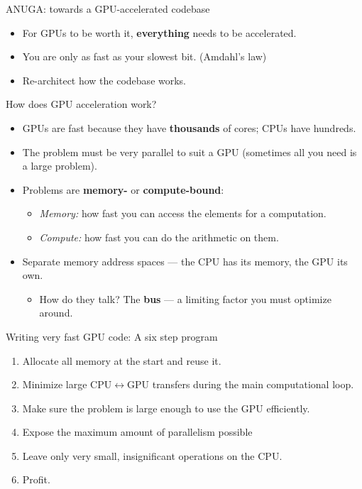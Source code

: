 \documentclass[aspectratio=169]{beamer}
\newcommand{\cplx}[1]{{\footnotesize\color{cookieMuted}#1}}
\begin{document}
\begin{frame}{ANUGA: towards a GPU-accelerated codebase}
  \begin{itemize}\setlength\itemsep{6pt}
    \item For GPUs to be worth it, \textbf{everything} needs to be accelerated.
    \item You are only as fast as your slowest bit. (Amdahl's law)
    \item Re-architect how the codebase works.
  \end{itemize}
\end{frame}

\begin{frame}{How does GPU acceleration work?}
  \begin{itemize}
    \item GPUs are fast because they have \textbf{thousands} of cores; CPUs have hundreds.
    \item The problem must be very parallel to suit a GPU \cplx{(sometimes all you need is a large problem)}.
    \item Problems are \textbf{memory-} or \textbf{compute-bound}:
      \begin{itemize}
        \item \emph{Memory:} how fast you can access the elements for a computation.
        \item \emph{Compute:} how fast you can do the arithmetic on them.
      \end{itemize}
    \item Separate memory address spaces --- the CPU has its memory, the GPU its own.
      \begin{itemize}
        \item How do they talk? The \textbf{bus} --- a limiting factor you must optimize around.
      \end{itemize}
  \end{itemize}
\end{frame}

\begin{frame}{Writing very fast GPU code: A six step program}
  \begin{enumerate}\setlength\itemsep{4pt}
    \item Allocate all memory at the start and reuse it.
    \item Minimize large CPU$\leftrightarrow$GPU transfers during the main computational loop.
    \item Make sure the problem is large enough to use the GPU efficiently.
    \item Expose the maximum amount of parallelism possible
    \item Leave only very small, insignificant operations on the CPU.
    \item Profit.
  \end{enumerate}
\end{frame}
\end{document}
